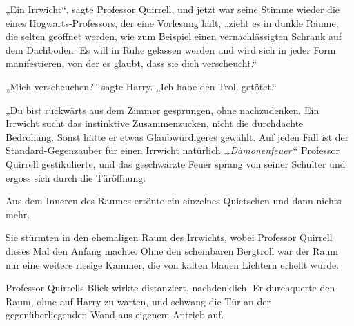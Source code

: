 „Ein Irrwicht“, sagte Professor Quirrell, und jetzt war seine Stimme wieder die eines Hogwarts-Professors, der eine Vorlesung hält, „zieht es in dunkle Räume, die selten geöffnet werden, wie zum Beispiel einen vernachlässigten Schrank auf dem Dachboden. Es will in Ruhe gelassen werden und wird sich in jeder Form manifestieren, von der es glaubt, dass sie dich verscheucht.“

„Mich verscheuchen?“ sagte Harry. „Ich habe den Troll getötet.“

„Du bist rückwärts aus dem Zimmer gesprungen, ohne nachzudenken. Ein Irrwicht sucht das instinktive Zusammenzucken, nicht die durchdachte Bedrohung. Sonst hätte er etwas Glaubwürdigeres gewählt. Auf jeden Fall ist der Standard-Gegenzauber für einen Irrwicht natürlich …\emph{Dämonenfeuer}.“
Professor Quirrell gestikulierte, und das geschwärzte Feuer sprang von seiner Schulter und ergoss sich durch die Türöffnung.

Aus dem Inneren des Raumes ertönte ein einzelnes Quietschen und dann nichts mehr.

Sie stürmten in den ehemaligen Raum des Irrwichts, wobei Professor Quirrell dieses Mal den Anfang machte. Ohne den scheinbaren Bergtroll war der Raum nur eine weitere riesige Kammer, die von kalten blauen Lichtern erhellt wurde.

Professor Quirrells Blick wirkte distanziert, nachdenklich. Er durchquerte den Raum, ohne auf Harry zu warten, und schwang die Tür an der gegenüberliegenden Wand aus eigenem Antrieb auf.

